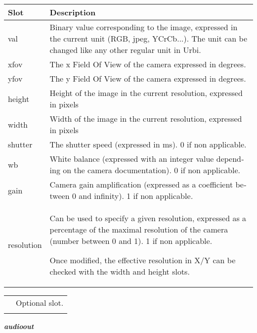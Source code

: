 \documentclass[a4paper]{article}
\begin{document}
\begin{flushleft}
\tablehead{}
\begin{supertabular}{|m{3.293cm}|m{11.997cm}|}
\hline
{}\sffamily\bfseries Slot &
\sffamily\bfseries Description\\\hline
{} val &
\sffamily Binary value corresponding to the
image, expressed in the current unit (RGB, jpeg, YCrCb...). The unit
can be changed like any other regular unit in Urbi. \\\hline
{} xfov &
\sffamily The x Field Of View of the camera
expressed in degrees.\\\hline
{} yfov &
\sffamily The y Field Of View of the camera
expressed in degrees.\\\hline
{} height &
\sffamily Height of the image in the current
resolution, expressed in pixels\\\hline
{} width &
\sffamily Width of the image in the current
resolution, expressed in pixels\\\hline
{} shutter &
 \foreignlanguage{english}{\textsf{The shutter
speed }}\foreignlanguage{english}{\textsf{(expressed in ms). 0 if non
applicable.}}\\\hline
{} wb &
 \foreignlanguage{english}{\textsf{White balance
}}\foreignlanguage{english}{\textsf{(expressed with an integer value
depending on the camera documentation). 0 if non applicable.}}\\\hline
{} gain &
 \foreignlanguage{english}{\textsf{Camera gain
amplification }}\foreignlanguage{english}{\textsf{(expressed as a
coefficient between 0 and infinity). 1 if non
applicable}}\foreignlanguage{english}{\textsf{\textit{.}}}\\\hline
{} resolution &
{\sffamily Can be used to specify a given
resolution, expressed as a percentage of the maximal resolution of the
camera (number between 0 and 1). 1 if non applicable. }

\sffamily Once modified, the effective
resolution in X/Y can be checked with the width and height
slots.\\\hline
\end{supertabular}
\end{flushleft}
\begin{flushleft}
\tablehead{}
\begin{supertabular}{|m{1.717cm}|m{10.464cm}}
\hhline{-~}
 &
 Optional slot.\\\hhline{-~}
\end{supertabular}
\end{flushleft}
{\sffamily\bfseries\itshape
audioout}
\end{document}
